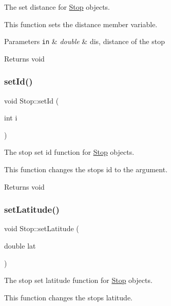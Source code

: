 The set distance for \hyperlink{classStop}{Stop} objects. 

This function sets the distance member variable.


\begin{DoxyParams}[1]{Parameters}
\mbox{\tt in}  & {\em double} & dis, distance of the stop\\
\hline
\end{DoxyParams}
\begin{DoxyReturn}{Returns}
void 
\end{DoxyReturn}
\mbox{\label{classStop_a936324668d7b9f5edfbe4531cf244608}} 
\subsubsection{\texorpdfstring{set\+Id()}{setId()}}
{\footnotesize\ttfamily void Stop\+::set\+Id (\begin{DoxyParamCaption}\item[{int}]{i }\end{DoxyParamCaption})}



The stop set id function for \hyperlink{classStop}{Stop} objects. 

This function changes the stop\textquotesingle{}s id to the argument.

\begin{DoxyReturn}{Returns}
void 
\end{DoxyReturn}
\mbox{\label{classStop_ad70323088d687724e6eaad1eb723061f}} 
\subsubsection{\texorpdfstring{set\+Latitude()}{setLatitude()}}
{\footnotesize\ttfamily void Stop\+::set\+Latitude (\begin{DoxyParamCaption}\item[{double}]{lat }\end{DoxyParamCaption})}



The stop set latitude function for \hyperlink{classStop}{Stop} objects. 

This function changes the stop\textquotesingle{}s latitude.

